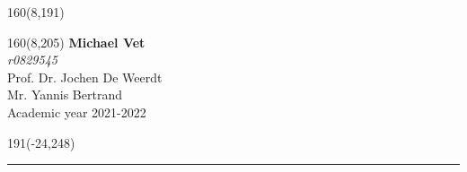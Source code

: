 %
\begin{textblock}{160}(8,191)
\textblockcolour{}
\vspace{-\parskip}
\flushright
\end{textblock}
%
\begin{textblock}{160}(8,205)
\textblockcolour{}
\vspace{-\parskip}
\flushright
\fontsize{14}{16}\selectfont \textbf{Michael Vet}\\
\fontsize{14}{16}\selectfont \textsl{r0829545}\\
\vspace{5mm}
Prof. Dr. Jochen De Weerdt\\
Mr. Yannis Bertrand\\
Academic year 2021-2022
\end{textblock}
%
\begin{textblock}{191}(-24,248)
{\color{blueline}\rule{550pt}{5.5pt}}
\end{textblock}
%
\vfill
